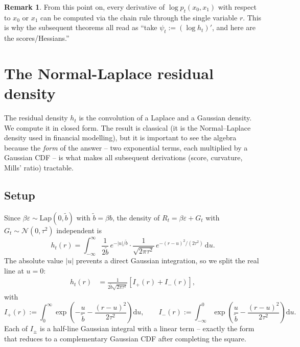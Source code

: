 \documentclass[11pt,a4paper,openany]{book}
\theoremstyle{plainserif}
\theoremstyle{definition}
\theoremstyle{remarkstyle}
\newtheorem*{remark}{Remark}
\newcommand{\Normal}{\mathcal{N}}
\newcommand{\Lap}{\mathrm{Lap}}
\newcommand{\btilde}{\tilde{b}}
\begin{document}
\begin{remark}
From this point on, every derivative of $\log p_t(x_0, x_1)$ with respect
to $x_0$ or $x_1$ can be computed via the chain rule through the single
variable $r$. This is why the subsequent theorems all read as ``take
$\psi_t := (\log h_t)'$, and here are the scores/Hessians.''
\end{remark}

\chapter{The Normal-Laplace residual density}
\label{ch:convolution}

The residual density $h_t$ is the convolution of a Laplace and a Gaussian
density. We compute it in closed form. The result is classical
(it is the Normal--Laplace density used in financial modelling), but it
is important to see the algebra because the \emph{form} of the answer --
two exponential terms, each multiplied by a Gaussian CDF -- is what makes
all subsequent derivations (score, curvature, Mills' ratio) tractable.

\section{Setup}

Since $\beta\varepsilon \sim \Lap(0, \btilde)$ with $\btilde = \beta b$, the density
of $R_t = \beta\varepsilon + G_t$ with $G_t \sim \Normal(0,\tau^2)$ independent is
\begin{equation}
h_t(r) = \int_{-\infty}^{\infty}
   \frac{1}{2\btilde}\, e^{-|u|/\btilde}\cdot
   \frac{1}{\sqrt{2\pi\tau^2}}\, e^{-(r-u)^2/(2\tau^2)} \,\mathrm{d}u.
\label{eq:h-convolution}
\end{equation}
The absolute value $|u|$ prevents a direct Gaussian integration, so we split
the real line at $u = 0$:
\begin{align}
h_t(r)
 &= \frac{1}{2\btilde\sqrt{2\pi\tau^2}}
   \left[ I_+(r) + I_-(r) \right],
\label{eq:h-split}
\end{align}
with
\begin{equation}
I_+(r) := \int_0^\infty\! \exp\!\left( -\frac{u}{\btilde} - \frac{(r-u)^2}{2\tau^2}\right)\!\mathrm{d}u,
\qquad
I_-(r) := \int_{-\infty}^0\!\exp\!\left( \frac{u}{\btilde} - \frac{(r-u)^2}{2\tau^2}\right)\!\mathrm{d}u.
\label{eq:I-pm-def}
\end{equation}
Each of $I_\pm$ is a half-line Gaussian integral with a linear term --
exactly the form that reduces to a complementary Gaussian CDF after
completing the square.
\end{document}
